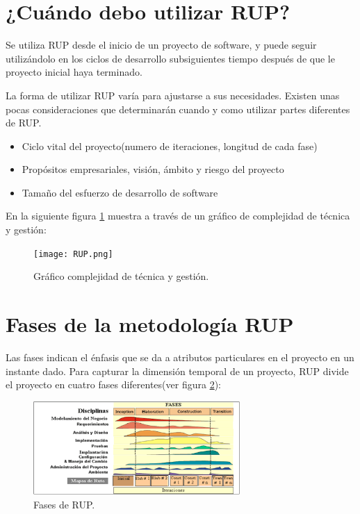 \documentclass[spanish]{udpreport}
\begin{document}
\section{¿Cuándo debo utilizar RUP?}
\label{sec: Cuando debo utilizar RUP}
Se utiliza RUP desde el inicio de  un proyecto de software, y puede seguir utilizándolo en los ciclos de desarrollo subsiguientes tiempo después de que le proyecto inicial haya terminado. \par
La forma de utilizar RUP varía para ajustarse a sus necesidades. Existen unas pocas consideraciones que determinarán cuando y como utilizar partes diferentes de RUP.
\begin{itemize}
\item Ciclo vital del proyecto(numero de iteraciones, longitud de cada fase)
\item Propósitos empresariales, visión, ámbito y riesgo del proyecto
\item Tamaño del esfuerzo de desarrollo de software
\end{itemize}
En la siguiente figura \ref{fig:grafico} muestra a través de un gráfico de complejidad de técnica y gestión:

\begin{figure}[H]
	\centering
	\texttt{[image: RUP.png]}
	\caption{\label{fig:grafico}Gráfico complejidad de técnica y gestión.}
\end{figure}

\section{Fases de la metodología RUP}
Las fases indican el énfasis que se da a atributos particulares en el proyecto en un instante dado. Para capturar la dimensión temporal de un proyecto, RUP divide el proyecto en cuatro fases diferentes(ver figura \ref{fig:fases}):

\begin{figure}[!h]
	\centering
	\includegraphics[width=0.7\textwidth]{fases.png}
	\caption{\label{fig:fases}Fases de RUP.}
\end{figure}
\end{document}
